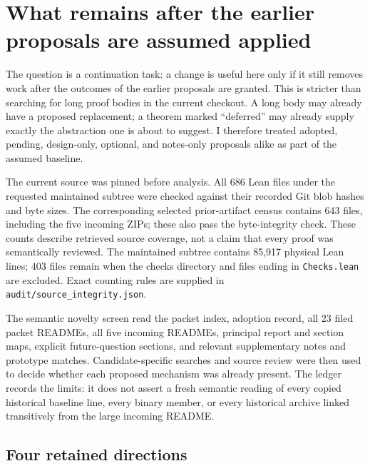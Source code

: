 \documentclass[11pt,letterpaper]{article}
\newcommand{\code}[1]{{\small\nolinkurl{#1}}}
\begin{document}
\section{What remains after the earlier proposals are assumed applied}

The question is a continuation task: a change is useful here only if it still removes work after the outcomes of the earlier proposals are granted. This is stricter than searching for long proof bodies in the current checkout. A long body may already have a proposed replacement; a theorem marked ``deferred'' may already supply exactly the abstraction one is about to suggest. I therefore treated adopted, pending, design-only, optional, and notes-only proposals alike as part of the assumed baseline.\cite{prior,incoming}

The current source was pinned before analysis. All 686 Lean files under the requested maintained subtree were checked against their recorded Git blob hashes and byte sizes. The corresponding selected prior-artifact census contains 643 files, including the five incoming ZIPs; these also pass the byte-integrity check. These counts describe retrieved source coverage, not a claim that every proof was semantically reviewed. The maintained subtree contains 85,917 physical Lean lines; 403 files remain when the checks directory and files ending in \code{Checks.lean} are excluded. Exact counting rules are supplied in \code{audit/source_integrity.json}.

The semantic novelty screen read the packet index, adoption record, all 23 filed packet READMEs, all five incoming READMEs, principal report and section maps, explicit future-question sections, and relevant supplementary notes and prototype matches. Candidate-specific searches and source review were then used to decide whether each proposed mechanism was already present. The ledger records the limits: it does not assert a fresh semantic reading of every copied historical baseline line, every binary member, or every historical archive linked transitively from the large incoming README.

\subsection{Four retained directions}
\end{document}
